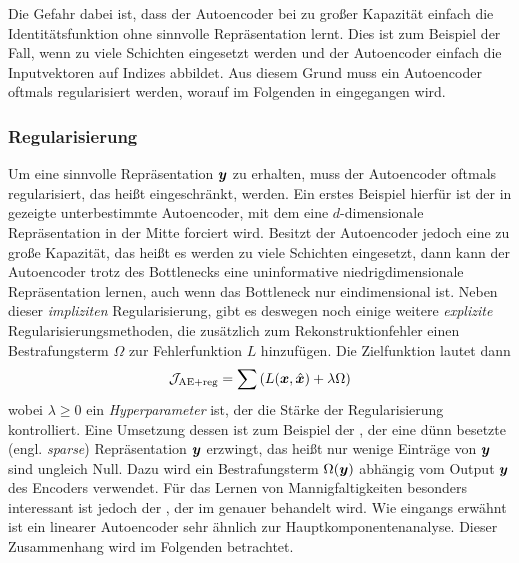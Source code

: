 Die Gefahr dabei ist, dass der Autoencoder bei zu großer Kapazität einfach die Identitätsfunktion
ohne sinnvolle Repräsentation lernt. Dies ist zum Beispiel der Fall, wenn zu viele Schichten
eingesetzt werden und der Autoencoder einfach die Inputvektoren auf Indizes abbildet. Aus diesem
Grund muss ein Autoencoder oftmals regularisiert werden, worauf im Folgenden in
 eingegangen wird.

\subsubsection{Regularisierung}
\label{ch:MethodenDerDimRed:ML:AE:Regularisierung}
Um eine sinnvolle Repräsentation $\bm{y}$ zu erhalten, muss der Autoencoder oftmals
regularisiert, das heißt eingeschränkt, werden. Ein erstes Beispiel hierfür ist der in
 gezeigte unterbestimmte Autoencoder, mit dem eine $d$-dimensionale
Repräsentation in der Mitte forciert wird. Besitzt der Autoencoder jedoch eine zu große Kapazität,
das heißt es werden zu viele Schichten eingesetzt, dann kann der Autoencoder trotz des Bottlenecks
eine uninformative niedrigdimensionale Repräsentation lernen, auch wenn das Bottleneck nur
eindimensional ist. Neben dieser \textit{impliziten} Regularisierung, gibt es deswegen noch einige
weitere \textit{explizite} Regularisierungsmethoden, die zusätzlich zum Rekonstruktionfehler einen
Bestrafungsterm $\Omega$ zur Fehlerfunktion $L$ hinzufügen. Die Zielfunktion lautet dann
\begin{equation}
	\mathcal{J}_{\text{AE+reg}} = \sum \left( L(\bm{x}, \hat{\bm{x}}) + \lambda \Omega \right)
\end{equation}
wobei $\lambda \geq 0$ ein \textit{Hyperparameter} ist, der die Stärke der Regularisierung kontrolliert.
Eine Umsetzung dessen ist zum Beispiel der , der eine dünn besetzte
(engl. \textit{sparse}) Repräsentation $\bm{y}$ erzwingt, das heißt nur wenige Einträge von
$\bm{y}$ sind ungleich Null. Dazu wird ein Bestrafungsterm $\Omega(\bm{y})$ abhängig vom Output $\bm{y}$ des Encoders verwendet. Für das Lernen von Mannigfaltigkeiten besonders interessant ist jedoch der
 \parencite{Rifai.2011}, der im  genauer behandelt wird. Wie
eingangs erwähnt ist ein linearer Autoencoder sehr ähnlich zur Hauptkomponentenanalyse. Dieser
Zusammenhang wird im Folgenden betrachtet.

